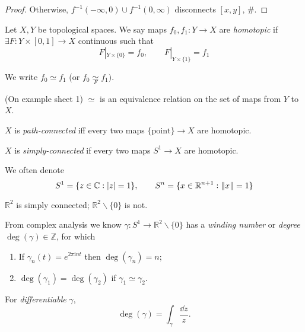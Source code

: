\documentclass[a4paper,11pt]{article}
\begin{document}
	\begin{proof}
		Otherwise, $f^{-1}(-\infty,0)\cup f^{-1}(0,\infty)$ disconnects $[x,y]$, \#. 
	\end{proof}

	\begin{defi}
		Let $X,Y$ be topological spaces. We say maps $f_0, f_1 : Y \to X$ are \emph{homotopic} if $\exists F : Y \times [0,1] \to X$ continuous such that
		\[
			F|_{Y \times \{0\}} = f_0, \qquad F|_{Y \times \{1\}} = f_1
		\]
		
		We write $f_0 \simeq f_1$ (or $f_0 \underset{F}{\simeq} f_1)$.
	\end{defi}

	\begin{exer}
		(On example sheet 1) $\simeq$ is an equivalence relation on the set of maps from $Y$ to $X$.
	\end{exer}

	\begin{nt}
		$X$ is \emph{path-connected} iff every two maps $\{\text{point}\} \to X$ are homotopic.
	\end{nt}

	\begin{defi}
		$X$ is \emph{simply-connected} if every two maps $S^1 \to X$ are homotopic.
	\end{defi}

	\begin{nt}
		We often denote
		\[
			S^1 = \{z \in \mathbb{C} : \abs{z} = 1\}, \qquad S^n = \{x\in \mathbb{R}^{n+1} : \norm{x} = 1\}
		\]
	\end{nt}

	\begin{ex}
		$\mathbb{R}^2$ is simply connected; $\mathbb{R}^2 \backslash \{0\}$ is not.

		From complex analysis we know $\gamma: S^1 \to \mathbb{R}^2 \backslash \{0\}$ has a \emph{winding number} or \emph{degree} $\deg (\gamma) \in \mathbb{Z}$, for which
		\begin{enumerate}
			\item If $\gamma_n (t) = e^{2\pi \mathrm{i} n t}$ then $\deg (\gamma_n) = n$;
			\item $\deg(\gamma_1) = \deg(\gamma_2)$ if $\gamma_1 \simeq \gamma_2$.  
		\end{enumerate} 

		For \emph{differentiable} $\gamma$, 
		$$\deg(\gamma) = \int_\gamma \frac{\dd{z}}{z}.$$
	\end{ex}
	
\end{document}
